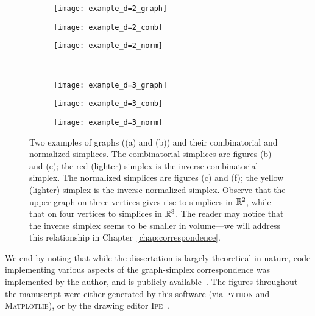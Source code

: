 \begin{figure}
	\centering
	\begin{subfigure}[b]{0.32\textwidth}
		\centering
		\texttt{[image: example\_d=2\_graph]}
		\vspace{0.2cm}
		\subcaption{}
	\end{subfigure}
\begin{subfigure}[b]{0.32\textwidth}
	\centering
	\texttt{[image: example\_d=2\_comb]}
	\subcaption{}
\end{subfigure}
\begin{subfigure}[b]{0.32\textwidth}
	\centering
	\texttt{[image: example\_d=2\_norm]}
	\subcaption{}
\end{subfigure}
\\ 
	\begin{subfigure}[b]{0.32\textwidth}
	\centering
	\texttt{[image: example\_d=3\_graph]}
	\vspace{0.2cm}
	\subcaption{}
\end{subfigure}
\begin{subfigure}[b]{0.32\textwidth}
	\centering
	\texttt{[image: example\_d=3\_comb]}
	\subcaption{}
\end{subfigure}
\begin{subfigure}[b]{0.32\textwidth}
	\centering
	\texttt{[image: example\_d=3\_norm]}
	\subcaption{}
\end{subfigure}
\caption{Two examples of graphs ((a) and (b)) and their combinatorial and normalized simplices.  The combinatorial simplices are figures (b) and (e); the red (lighter) simplex is the inverse combinatorial simplex. The normalized simplices are figures (c) and (f); the yellow (lighter) simplex is the inverse normalized simplex. Observe that the upper graph on three vertices gives rise to simplices in $\mathbb{R}^2$, while that on  four vertices to simplices in $\mathbb{R}^3$. The reader may notice that the  inverse simplex seems to  be smaller in volume---we will address this relationship in Chapter~\ref{chap:correspondence}.   }
\end{figure}

We  end by noting that while the dissertation is largely theoretical  in nature, code implementing various  aspects of the  graph-simplex correspondence was implemented by the author, and is publicly available~\cite{chugg2019graph}. The figures throughout the manuscript were either generated by this software (via \textsc{python} and \textsc{Matplotlib}),  or by the drawing editor \textsc{Ipe}~\cite{cheong2014ipe}.    

